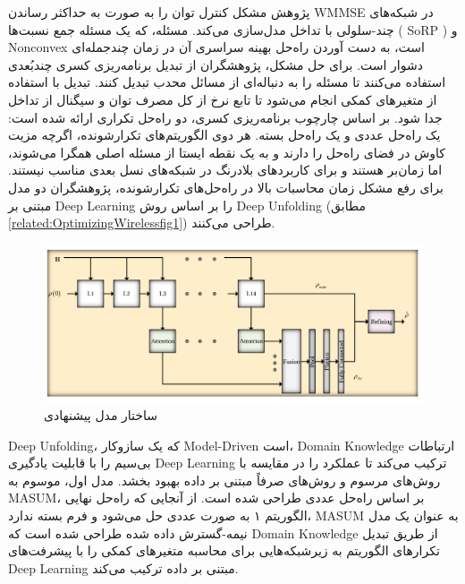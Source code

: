 پژوهش مشکل کنترل توان را به صورت به حداکثر رساندن 
\gls{WMMSE}
در شبکه‌های چند-سلولی با تداخل مدل‌سازی می‌کند.  مسئله، که یک مسئله جمع نسبت‌ها (
\gls{SoRP}
) و 
\gls{Nonconvex}
است، به دست آوردن راه‌حل بهینه سراسری آن در زمان چندجمله‌ای دشوار است. برای حل  مشکل، پژوهشگران از تبدیل برنامه‌ریزی کسری چندبُعدی استفاده می‌کنند تا مسئله را به دنباله‌ای از مسائل محدب تبدیل کنند.  تبدیل با استفاده از متغیرهای کمکی انجام می‌شود تا تابع نرخ از کل مصرف توان و سیگنال از تداخل جدا شود.
بر اساس  چارچوب برنامه‌ریزی کسری، دو راه‌حل تکراری ارائه شده است: یک راه‌حل عددی و یک راه‌حل بسته. هر دوی  الگوریتم‌های تکرارشونده، اگرچه مزیت کاوش در فضای راه‌حل را دارند و به یک نقطه ایستا از مسئله اصلی همگرا می‌شوند، اما زمان‌بر هستند و برای کاربردهای بلادرنگ در شبکه‌های نسل بعدی مناسب نیستند.
برای رفع مشکل زمان محاسبات بالا در راه‌حل‌های تکرارشونده، پژوهشگران دو مدل مبتنی بر 
\gls{Deep Learning}
را بر اساس روش 
\gls{Deep Unfolding}
(مطابق \autoref{related:OptimizingWirelessfig1})
 طراحی می‌کنند. 
\begin{figure}
	\centering
	\includegraphics[width=0.7\linewidth]{./Pic/OptimizingWireless_related_fig1}
	\caption[ ساختار مدل پیشنهادی]{ساختار مدل پیشنهادی \cite{OptimizingWireless}}
	\label{related:OptimizingWirelessfig1}
\end{figure}
\gls{Deep Unfolding}،
که یک سازوکار 
\gls{Model-Driven}
است، 
\gls{Domain Knowledge}
ارتباطات بی‌سیم را با قابلیت یادگیری 
\gls{Deep Learning}
ترکیب می‌کند تا عملکرد را در مقایسه با روش‌های مرسوم و روش‌های صرفاً مبتنی بر داده  بهبود بخشد.
مدل اول، موسوم به 
\gls{MASUM}،
 بر اساس راه‌حل عددی طراحی شده است. از آنجایی که راه‌حل نهایی الگوریتم ۱ به صورت عددی حل می‌شود و فرم بسته ندارد،
\gls{MASUM}
به عنوان یک مدل نیمه-گسترش داده شده طراحی شده است که 
\gls{Domain Knowledge}
از طریق تبدیل تکرارهای الگوریتم به زیرشبکه‌هایی برای محاسبه متغیرهای کمکی را با پیشرفت‌های 
\gls{Deep Learning}
مبتنی بر داده ترکیب می‌کند.

